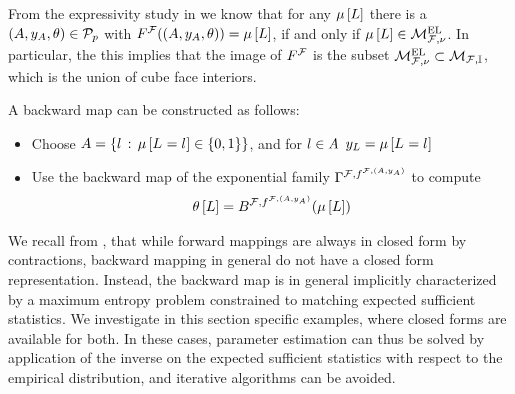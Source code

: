 From the expressivity study in  we know that for any $\mu\left[L\right]$ there is a $(A,y_{A},\theta)\in\mathcal{P}_{p}$ with $F^{\mathcal{F}}((A,y_{A},\theta))=\mu\left[L\right]$, if and only if $\mu\left[L\right]\in\mathcal{M}^{\mathrm{EL}}_{\mathcal{F},\nu}$.
In particular, the this implies that the image of $F^{\mathcal{F}}$ is the subset $\mathcal{M}^{\mathrm{EL}}_{\mathcal{F},\nu}\subset\mathcal{M}_{\mathcal{F},\mathbb{I}}$, which is the union of cube face interiors.

A backward map can be constructed as follows:
\begin{itemize}
    \item Choose $A=\{l\,:\,\mu\left[L_{}=l_{}\right]\in\{0,1\}\}$, and for $l\in A$ $y_{L}=\mu\left[L_{}=l_{}\right]$
    \item Use the backward map of the exponential family $\Gamma^{\mathcal{F},f^{\mathcal{F},(A,y_{A})}}$ to compute
    \begin{align*}
        \theta\left[L\right] = B^{\mathcal{F},f^{\mathcal{F},(A,y_{A})}}(\mu\left[L\right])
    \end{align*}
\end{itemize}



We recall from , that while forward mappings are always in closed form by contractions, backward mapping in general do not have a closed form representation.
Instead, the backward map is in general implicitly characterized by a maximum entropy problem constrained to matching expected sufficient statistics.
We investigate in this section specific examples, where closed forms are available for both.
In these cases, parameter estimation can thus be solved by application of the inverse on the expected sufficient statistics with respect to the empirical distribution, and iterative algorithms can be avoided.

